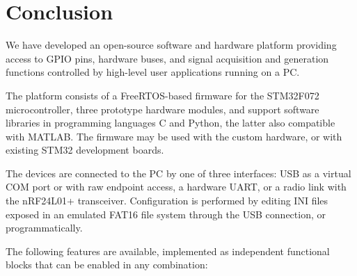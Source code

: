 \chapter{Conclusion}

We have developed an open-source software and hardware platform providing access to \gls{GPIO} pins, hardware buses, and signal acquisition and generation functions controlled by high-level user applications running on a \gls{PC}. 

The platform consists of a FreeRTOS-based firmware for the STM32F072 microcontroller, three prototype hardware modules, and support software libraries in programming languages C and Python, the latter also compatible with MATLAB. The firmware may be used with the custom hardware, or with existing STM32 development boards.

The devices are connected to the \gls{PC} by one of three interfaces: \gls{USB} as a virtual COM port or with raw endpoint access, a hardware \gls{UART}, or a radio link with the nRF24L01+ transceiver. Configuration is performed by editing INI files exposed in an emulated FAT16 file system through the \gls{USB} connection, or programmatically.

\noindent
The following features are available, implemented as independent functional blocks that can be enabled in any combination:

